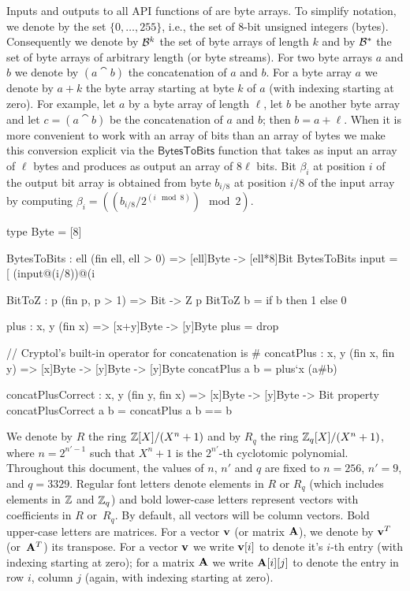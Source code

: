 Inputs and outputs to all API functions of \Kyber are byte arrays.
To simplify notation, we denote by \Bytes the set $\{0,\dots,255\}$, i.e., 
the set of $8$-bit unsigned integers (bytes). 
Consequently we denote by $\mathcal{B}^k$ the set of byte arrays of length $k$
and by $\mathcal{B}^*$ the set of byte arrays of arbitrary length (or byte streams).
For two byte arrays $a$ and $b$ we denote by $(a\cat b)$ the concatenation
of $a$ and $b$.
For a byte array $a$ we denote by $a+k$ the byte array
starting at byte $k$ of $a$ (with indexing starting at zero).
For example, let $a$ by a byte array of length $\ell$, let $b$
be another byte array and let $c = (a\cat b)$ be the concatenation
of $a$ and $b$; then $b = a+\ell$.
When it is more convenient to work with an array of bits than an
array of bytes we make this conversion explicit via the $\mathsf{BytesToBits}$ 
function that takes as input an array of $\ell$ bytes and produces as
output an array of $8\ell$ bits. Bit $\beta_i$ at position $i$ of the output bit array 
is obtained from byte $b_{i/8}$ at position $i/8$ of the input array
by computing $\beta_i = \left((b_{i/8} / 2^{(i\mod 8)}) \mod 2\right)$.

\begin{code}
  type Byte = [8]

  BytesToBits : {ell} (fin ell, ell > 0) => [ell]Byte -> [ell*8]Bit
  BytesToBits input = [ (input@(i/8))@(i%
  
  BitToZ : {p} (fin p, p > 1) => Bit -> Z p
  BitToZ b = if b then 1 else 0
  
  plus : {x, y} (fin x) => [x+y]Byte -> [y]Byte
  plus = drop

  // Cryptol's built-in operator for concatenation is #
  concatPlus : {x, y} (fin x, fin y) => [x]Byte -> [y]Byte -> [y]Byte
  concatPlus a b = plus`{x} (a#b)
  
  concatPlusCorrect : {x, y} (fin y, fin x) => [x]Byte -> [y]Byte -> Bit
  property concatPlusCorrect a b = concatPlus a b == b
\end{code}
We denote by $R$ the ring $\mathbb{Z}[X]/(X^{n}+1)$ and by $R_q$ the ring $\mathbb{Z}_q[X]/(X^{n}+1)$, 
where $n=2^{n'-1}$ such that $X^{n}+1$ is the $2^{n'}$-th cyclotomic polynomial. 
Throughout this document, the values of $n$, $n'$ and $q$ are fixed to $n=256$, $n'=9$, and $q=3329$.
Regular font letters denote elements in $R$ or $R_q$ (which includes elements in $\mathbb{Z}$ and $\mathbb{Z}_q$) 
and bold lower-case letters represent vectors with coefficients in $R$ or~$R_q$.  
By default, all vectors will be column vectors. Bold upper-case letters are matrices. 
For a vector $\mathbf{v}$ (or matrix $\mathbf{A}$), we denote by $\mathbf{v}^T$ (or~$\mathbf{A}^T$) its transpose.
For a vector $\mathbf{v}$ we write $\mathbf{v}[i]$ to denote it's $i$-th entry (with indexing starting at zero);
for a matrix $\mathbf{A}$ we write $\mathbf{A}[i][j]$ to denote the entry in row $i$, column $j$ 
(again, with indexing starting at zero).

